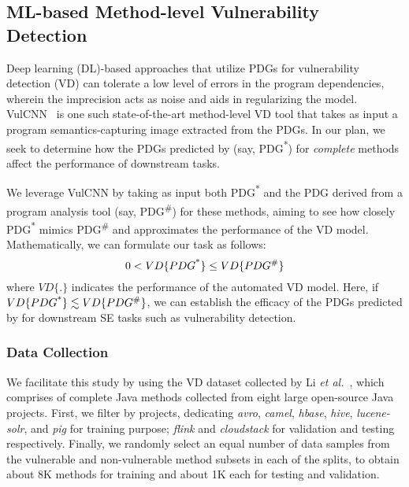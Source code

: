 \subsection{ML-based Method-level Vulnerability Detection}
\label{sec:vd}




Deep learning (DL)-based approaches that utilize PDGs for
vulnerability detection (VD) can tolerate a low level of errors in the
program dependencies, wherein the imprecision acts as noise and aids
in regularizing the model. VulCNN~\cite{wu2022vulcnn} is one such
state-of-the-art method-level VD tool that takes as input a program
semantics-capturing image extracted from the PDGs. In our plan,
we seek to determine how the PDGs predicted by \tool (say,
PDG\textsuperscript{*}) for {\em complete} methods affect the
performance of downstream tasks.


We leverage VulCNN by taking as input both PDG\textsuperscript{*} and
the PDG derived from a program analysis tool (say,
PDG\textsuperscript{\#}) for these methods, aiming to see how closely
PDG\textsuperscript{*} mimics PDG\textsuperscript{\#} and approximates
the performance of the VD model. Mathematically, we can formulate our
task as follows:
\begin{equation}
    \centering
    0 < VD\{PDG\textsuperscript{*}\} \leq VD\{PDG\textsuperscript{\#}\}
\end{equation}
where $VD\{.\}$ indicates the performance of the automated VD model. Here, if $VD\{PDG\textsuperscript{*}\} \lesssim VD\{PDG\textsuperscript{\#}\}$, we can establish the efficacy of the PDGs predicted by \tool for downstream SE tasks such as vulnerability detection.


\subsubsection*{\bf Data Collection}
We facilitate this study by using the VD dataset collected by Li {\em
  et al.}~\cite{yioopsla19}, which comprises of
complete Java methods collected from eight large
open-source Java projects. First, we filter by projects, dedicating
\textit{avro}, \textit{camel}, \textit{hbase}, \textit{hive},
\textit{lucene-solr}, and \textit{pig} for training purpose;
\textit{flink} and \textit{cloudstack} for validation and testing
respectively.
Finally, we randomly select an equal number of data samples from the
vulnerable and non-vulnerable method subsets in each of the splits, to
obtain about 8K methods for training and about 1K each for testing and
validation.

